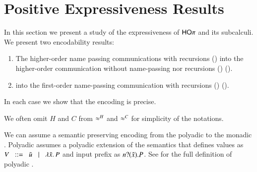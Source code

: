 \section{Positive Expressiveness Results}

\label{sec:positive}
In this section we present a study of the expressiveness
of $\mathsf{HO}\pi$ and its subcalculi. 
We present two encodability results:
%
\begin{enumerate}[1.]
	\item	The higher-order name passing communications with recursions (\HOp) into
		the higher-order communication without name-passing nor 
		recursions (\HO) ().

	\item	\HOp into the first-order name-passing communication
		with recursions (\sessp) (). 
\end{enumerate}
%
In each case we show that the encoding is precise.

We often omit $H$ and $C$ from $\approx^{H}$ and $\approx^{C}$ for simplicity of the notations. 



\begin{remark}
	We can assume a semantic preserving encoding from the polyadic
	\HOp to the monadic \HOp. Polyadic \HOp assumes a polyadic
	extension of the \HOp semantics that defines values as
	$V \;\;::=\;\; \tilde{u} \;\;\;|\;\;\; \lambda \tilde{x}.\,P$
	and input prefix as $n ? (\tilde{x}) . P$.
	See  for the full definition of
	polyadic \HOp.
\end{remark}

